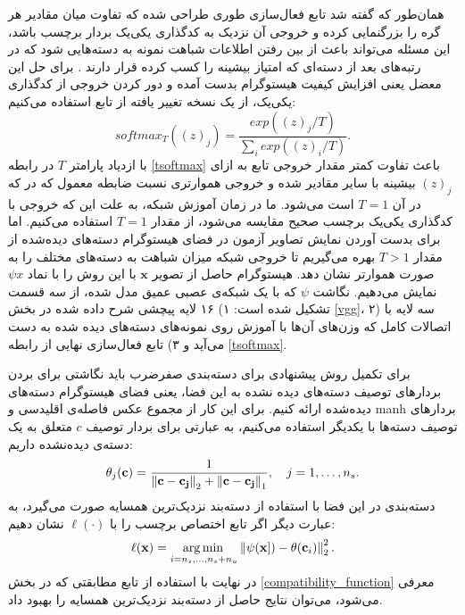  همان‌طور که گفته شد تابع فعال‌سازی  طوری طراحی شده که تفاوت میان مقادیر هر گره را بزرگنمایی کرده و خروجی آن نزدیک به کدگذاری یکی‌یک بردار برچسب باشد، این مسئله می‌تواند باعث از بین رفتن اطلاعات شباهت نمونه به دسته‌هایی شود که در رتبه‌های بعد از دسته‌ای که امتیاز بیشینه را کسب کرده قرار دارند \cite{dark}. برای حل این معضل یعنی افزایش کیفیت هیستوگرام بدست آمده و دور کردن خروجی از کدگذاری یکی‌یک، از یک نسخه تغییر یافته از تابع   استفاده می‌کنیم:
 \begin{equation}
 \label{tsoftmax}
	softmax_T((z)_j) = \frac{exp((z)_j/T)}{\sum_i exp((z)_i/T)}.
 \end{equation}
با ازدیاد پارامتر $T$ در رابطه \eqref{tsoftmax} باعث تفاوت کمتر مقدار خروجی تابع به ازای $(z)_j$ بیشینه با سایر مقادیر شده و خروجی هموارتری نسبت ضابطه معمول که در که در آن $T=1$ است می‌شود. ما در زمان آموزش شبکه، به علت این که خروجی با کدگذاری یکی‌یک برچسب صحیح مقایسه می‌شود، از مقدار $T=1$ استفاده می‌کنیم. اما برای بدست آوردن نمایش تصاویر آزمون در فضای هیستوگرام دسته‌های دیده‌شده از مقدار $T>1$ بهره می‌گیریم تا خروجی شبکه میزان شباهت به دسته‌های مختلف را به صورت هموارتر نشان دهد. هیستوگرام حاصل از تصویر $\mathbf{x}$ با این روش را با نماد $\psi{x}$ نمایش می‌دهیم. نگاشت $\psi$ که با یک شبکه‌ی عصبی عمیق مدل شده، از سه قسمت تشکیل شده است: ۱) ۱۶ لایه پیچشی شرح داده شده در بخش \ref{vgg}،
۲) سه لایه با اتصالات کامل که وزن‌های آن‌ها با آموزش روی نمونه‌های دسته‌های دیده شده به دست می‌آید و ۳) تابع فعال‌سازی نهایی از رابطه \ref{tsoftmax}.

برای تکمیل روش‌ پیشنهادی برای دسته‌بندی صفرضرب باید نگاشتی برای بردن بردارهای توصیف دسته‌های دیده نشده به این فضا، یعنی فضای هیستوگرام دسته‌های دیده‌شده ارائه کنیم. برای این کار از مجموع عکس فاصله‌ی اقلیدسی و \gls{manh} بردارهای توصیف دسته‌ها با یکدیگر استفاده می‌کنیم، به عبارتی برای بردار توصیف $c$ متعلق به یک دسته‌ی دیده‌نشده داریم:
 \begin{equation}
\theta_j(\mathbf{c}) = \frac{1}{\left \lVert \mathbf{c - c_j} \right \rVert_2 + \left \lVert \mathbf{c - c_j} \right \rVert_1 }, \quad j=1,\ldots, n_s.
\end{equation}
 دسته‌بندی در این فضا با استفاده از  دسته‌بند نزدیک‌ترین همسایه صورت می‌گیرد، به عبارت دیگر اگر تابع اختصاص برچسب را با $\ell(\cdot)$ نشان دهیم:
\begin{equation}
\ell(\mathbf{x}) = \operatorname*{arg\,min\,}_{i=n_s, \ldots, n_s+n_u} \left \lVert \psi(\mathbf{x}]) - \theta(\mathbf{c}_i) \right \rVert_2^2.
\end{equation}
در نهایت با استفاده از تابع مطابقتی که در بخش \ref{compatibility_function} معرفی می‌شود، می‌توان نتایج حاصل از دسته‌بند نزدیک‌ترین همسایه را بهبود داد.
